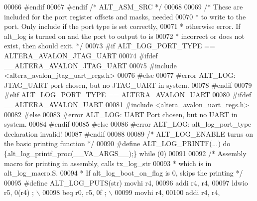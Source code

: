 \begin{DoxyCode}
00066 \textcolor{preprocessor}{        #endif}
00067 \textcolor{preprocessor}{    #endif }\textcolor{comment}{/* ALT\_ASM\_SRC */}\textcolor{preprocessor}{}
00068 
00069     \textcolor{comment}{/* These are included for the port register offsets and masks, needed}
00070 \textcolor{comment}{     * to write to the port.  Only include if the port type is set correctly,}
00071 \textcolor{comment}{     * otherwise error.  If alt\_log is turned on and the port to output to is}
00072 \textcolor{comment}{     * incorrect or does not exist, then should exit. */}
00073 \textcolor{preprocessor}{    #if ALT\_LOG\_PORT\_TYPE == ALTERA\_AVALON\_JTAG\_UART }
00074 \textcolor{preprocessor}{        #ifdef \_\_ALTERA\_AVALON\_JTAG\_UART}
00075 \textcolor{preprocessor}{            #include <altera\_avalon\_jtag\_uart\_regs.h>}
00076 \textcolor{preprocessor}{        #else}
00077 \textcolor{preprocessor}{            #error ALT\_LOG: JTAG\_UART port chosen, but no JTAG\_UART in system. }
00078 \textcolor{preprocessor}{        #endif}
00079 \textcolor{preprocessor}{    #elif ALT\_LOG\_PORT\_TYPE == ALTERA\_AVALON\_UART }
00080 \textcolor{preprocessor}{        #ifdef \_\_ALTERA\_AVALON\_UART}
00081 \textcolor{preprocessor}{            #include <altera_avalon_uart_regs.h>}
00082 \textcolor{preprocessor}{        #else}
00083 \textcolor{preprocessor}{            #error ALT\_LOG: UART Port chosen, but no UART in system.}
00084 \textcolor{preprocessor}{        #endif}
00085 \textcolor{preprocessor}{    #else}
00086 \textcolor{preprocessor}{        #error ALT\_LOG: alt\_log\_port\_type declaration invalid!}
00087 \textcolor{preprocessor}{    #endif}
00088 
00089     \textcolor{comment}{/* ALT\_LOG\_ENABLE turns on the basic printing function */}
00090 \textcolor{preprocessor}{    #define ALT\_LOG\_PRINTF(...) do \{alt\_log\_printf\_proc(\_\_VA\_ARGS\_\_);\} while (0)}
00091  
00092     \textcolor{comment}{/* Assembly macro for printing in assembly, calls tx\_log\_str}
00093 \textcolor{comment}{     * which is in alt\_log\_macro.S.}
00094 \textcolor{comment}{     * If alt\_log\_boot\_on\_flag is 0, skips the printing */}
00095 \textcolor{preprocessor}{    #define ALT\_LOG\_PUTS(str) movhi r4, %
00096 \textcolor{preprocessor}{         addi r4, r4, %
00097 \textcolor{preprocessor}{         ldwio r5, 0(r4) ; \(\backslash\)}
00098 \textcolor{preprocessor}{         beq r0, r5, 0f ; \(\backslash\)}
00099 \textcolor{preprocessor}{         movhi r4, %
00100 \textcolor{preprocessor}{         addi r4, r4, %
}}}}
\end{DoxyCode}
